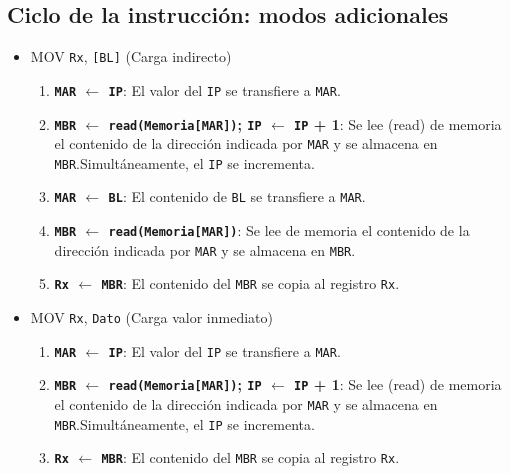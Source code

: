 \documentclass[12pt,oneside]{templates/unerthesis}
\providecommand{\tightlist}{%
  \setlength{\itemsep}{0pt}\setlength{\parskip}{0pt}}
\begin{document}
\hypertarget{ciclo-de-la-instrucciuxf3n-modos-adicionales}{%
\subsection{Ciclo de la instrucción: modos adicionales}\label{ciclo-de-la-instrucciuxf3n-modos-adicionales}}

\begin{itemize}
\tightlist
\item
  MOV \texttt{Rx}, \texttt{{[}BL{]}} (Carga indirecto)

  \begin{enumerate}
  \def\labelenumi{\arabic{enumi}.}
  \tightlist
  \item
    \textbf{\texttt{MAR} \(\leftarrow\) \texttt{IP}}:
    El valor del \texttt{IP} se transfiere a \texttt{MAR}.
  \item
    \textbf{\texttt{MBR} \(\leftarrow\) \texttt{read(Memoria{[}MAR{]})}; \texttt{IP} \(\leftarrow\) \texttt{IP} + 1}:
    Se lee (read) de memoria el contenido de la dirección indicada por \texttt{MAR} y se almacena en \texttt{MBR}.Simultáneamente, el \texttt{IP} se incrementa.
  \item
    \textbf{\texttt{MAR} \(\leftarrow\) \texttt{BL}}:
    El contenido de \texttt{BL} se transfiere a \texttt{MAR}.
  \item
    \textbf{\texttt{MBR} \(\leftarrow\) \texttt{read(Memoria{[}MAR{]})}}:
    Se lee de memoria el contenido de la dirección indicada por \texttt{MAR} y se almacena en \texttt{MBR}.
  \item
    \textbf{\texttt{Rx} \(\leftarrow\) \texttt{MBR}}:
    El contenido del \texttt{MBR} se copia al registro \texttt{Rx}.
  \end{enumerate}
\item
  MOV \texttt{Rx}, \texttt{Dato} (Carga valor inmediato)

  \begin{enumerate}
  \def\labelenumi{\arabic{enumi}.}
  \tightlist
  \item
    \textbf{\texttt{MAR} \(\leftarrow\) \texttt{IP}}:
    El valor del \texttt{IP} se transfiere a \texttt{MAR}.
  \item
    \textbf{\texttt{MBR} \(\leftarrow\) \texttt{read(Memoria{[}MAR{]})}; \texttt{IP} \(\leftarrow\) \texttt{IP} + 1}:
    Se lee (read) de memoria el contenido de la dirección indicada por \texttt{MAR} y se almacena en \texttt{MBR}.Simultáneamente, el \texttt{IP} se incrementa.
  \item
    \textbf{\texttt{Rx} \(\leftarrow\) \texttt{MBR}}:
    El contenido del \texttt{MBR} se copia al registro \texttt{Rx}.
  \end{enumerate}
\end{itemize}
\end{document}
